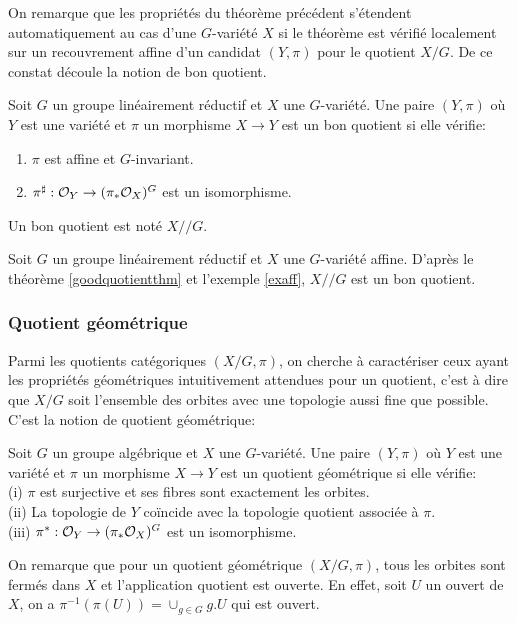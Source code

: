 On remarque que les propriétés du théorème précédent s'étendent automatiquement au cas d'une $G$-variété $X$ si le théorème est vérifié localement sur un recouvrement affine d'un candidat $(Y,\pi)$ pour le quotient $X/G$. De ce constat découle la notion de bon quotient.

\begin{defn}
Soit $G$ un groupe linéairement réductif et $X$ une $G$-variété. Une paire $(Y, \pi)$ où $Y$ est une variété et $\pi$ un morphisme $X\rightarrow Y$ est un bon quotient si elle vérifie:
\begin{enumerate}
\item $\pi$ est affine et $G$-invariant.
\item $\pi^\sharp:\mathcal{O}_Y \rightarrow (\pi_*\mathcal{O}_X)^G$ est un isomorphisme.
\end{enumerate}
Un bon quotient est noté $X//G$.
\end{defn}

\begin{ex}
Soit $G$ un groupe linéairement réductif et $X$ une $G$-variété affine. D'après le théorème \ref{goodquotientthm} et l'exemple \ref{exaff}, $X//G$ est un bon quotient.
\end{ex}


\subsubsection{Quotient géométrique}

Parmi les quotients catégoriques $(X/G,\pi)$, on cherche à caractériser ceux ayant les propriétés géométriques intuitivement attendues pour un quotient, c'est à dire que $X/G$ soit l'ensemble des orbites avec une topologie aussi fine que possible. C'est la notion de quotient géométrique:

\begin{defn}
Soit $G$ un groupe algébrique et $X$ une $G$-variété. Une paire $(Y, \pi)$ où $Y$ est une variété et $\pi$ un morphisme $X\rightarrow Y$ est un quotient géométrique si elle vérifie:\\
(i) $\pi$ est surjective et ses fibres sont exactement les orbites.\\
(ii) La topologie de $Y$ coïncide avec la topologie quotient associée à $\pi$.\\
(iii) $\pi^*:\mathcal{O}_Y \rightarrow (\pi_*\mathcal{O}_X)^G$ est un isomorphisme.
\end{defn}

On remarque que pour un quotient géométrique $(X/G, \pi)$, tous les orbites sont fermés dans $X$ et l'application quotient est ouverte. En effet, soit $U$ un ouvert de $X$, on a $\pi^{-1}(\pi(U))=\cup_{g\in G}g.U$ qui est ouvert.

